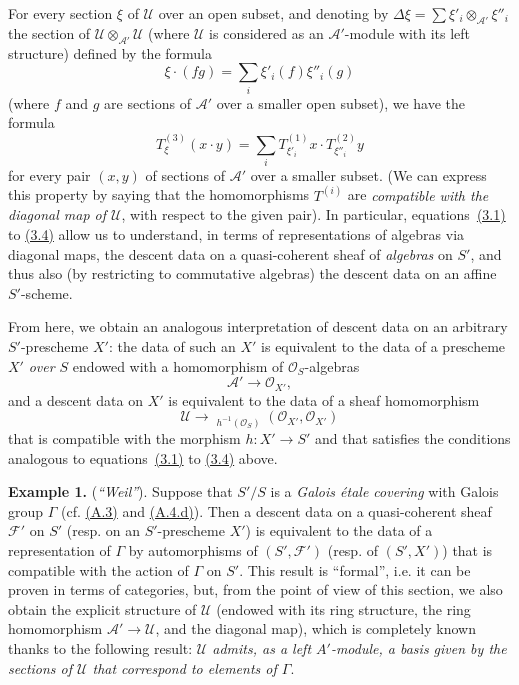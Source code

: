 \documentclass{article}
\newenvironment{rmenv}[1]
  {\phantomsection\par\medskip\noindent\textbf{#1.}\rmfamily}
  {\medskip}
\newcommand{\scr}[1]{{\mathscr{#1}}}
\renewcommand{\cal}[1]{{\mathcal{#1}}}
\DeclareMathOperator{\Hom}{Hom}
\DeclareMathOperator{\shHom}{\underline{\Hom}}
\newcommand{\oldpage}[1]{\marginpar{\footnotesize$\Big\vert$ \textit{p.~#1}}}
\begin{document}
For every section $\xi$ of $\scr{U}$ over an open subset, and denoting by $\Delta\xi=\sum\xi'_i\otimes_{\scr{A}'}\xi''_i$ the section of $\scr{U}\otimes_{\scr{A}'}\scr{U}$ (where $\scr{U}$ is considered as an $\scr{A}'$-module with its left structure) defined by the formula
\[
  \xi\cdot(fg) = \sum_i\xi'_i(f)\xi''_i(g)
\]
(where $f$ and $g$ are sections of $\scr{A}'$ over a smaller open subset), we have the formula
\[
\label{equation:B.3.4}
  T_\xi^{(3)}(x\cdot y) = \sum_i T_{\xi'_i}^{(1)}x\cdot T_{\xi''_i}^{(2)}y
\tag{3.4}
\]
for every pair $(x,y)$ of sections of $\scr{A}'$ over a smaller subset.
(We can express this property by saying that the homomorphisms $T^{(i)}$ are \emph{compatible with the diagonal map of $\scr{U}$}, with respect to the given pair).
In particular, equations~\hyperref[equation:B.3.1]{(3.1)} to \hyperref[equation:B.3.4]{(3.4)} allow us to understand, in terms of representations of algebras via diagonal maps, the descent data on a quasi-coherent sheaf of \emph{algebras} on $S'$, and thus also (by restricting to commutative algebras) the descent data on an affine $S'$-scheme.

From here, we obtain an analogous interpretation of descent data on an arbitrary $S'$-prescheme $X'$:
the data of such an $X'$ is equivalent to the data of a prescheme $X'$ \emph{over $S$} endowed with a homomorphism of $\scr{O}_S$-algebras
\[
  \scr{A}'\to\scr{O}_{X'},
\]
and a descent data on $X'$ is equivalent to the data of a sheaf homomorphism
\[
  \scr{U}
  \to \shHom_{h^{-1}(\scr{O}_S)}(\scr{O}_{X'},\scr{O}_{X'})
\]
that is compatible with the morphism $h\colon X'\to S'$ and that satisfies the conditions analogous to equations~\hyperref[equation:B.3.1]{(3.1)} to \hyperref[equation:B.3.4]{(3.4)} above.

\begin{rmenv}{Example 1}
\label{example:B.3(1)}
  (\emph{``Weil''}).
  Suppose that $S'/S$ is a \emph{Galois \'{e}tale covering} with Galois group $\Gamma$ (cf. \hyperref[A.3]{(A.3)} and \hyperref[A.4.d]{(A.4.d)}).
  Then a descent data on a quasi-coherent sheaf $\cal{F}'$ on $S'$ (resp. on an $S'$-prescheme $X'$) is equivalent to the data of a representation of $\Gamma$ by automorphisms of $(S',\cal{F}')$ (resp. of $(S',X')$) that is compatible with the action of $\Gamma$ on $S'$.
  This result
\oldpage{190-23}
  is ``formal'', i.e. it can be proven in terms of categories, but, from the point of view of this section, we also obtain the explicit structure of $\scr{U}$ (endowed with its ring structure, the ring homomorphism $\scr{A}'\to\scr{U}$, and the diagonal map), which is completely known thanks to the following result:
  \emph{$\scr{U}$ admits, as a left $A'$-module, a basis given by the sections of $\scr{U}$ that correspond to elements of $\Gamma$}.
\end{rmenv}
\end{document}
